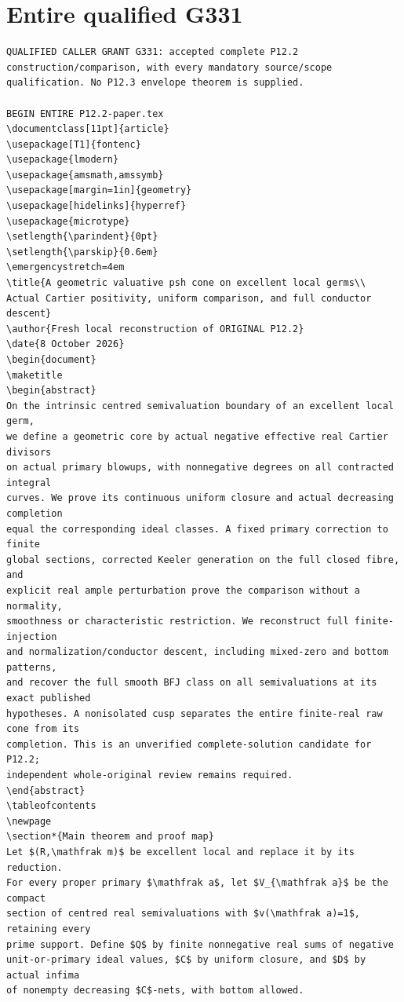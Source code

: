 \documentclass[
]{article}
\begin{document}
\section{Entire qualified G331}
\begingroup\tiny
\begin{verbatim}
QUALIFIED CALLER GRANT G331: accepted complete P12.2 construction/comparison, with every mandatory source/scope qualification. No P12.3 envelope theorem is supplied.

BEGIN ENTIRE P12.2-paper.tex
\documentclass[11pt]{article}
\usepackage[T1]{fontenc}
\usepackage{lmodern}
\usepackage{amsmath,amssymb}
\usepackage[margin=1in]{geometry}
\usepackage[hidelinks]{hyperref}
\usepackage{microtype}
\setlength{\parindent}{0pt}
\setlength{\parskip}{0.6em}
\emergencystretch=4em
\title{A geometric valuative psh cone on excellent local germs\\
Actual Cartier positivity, uniform comparison, and full conductor descent}
\author{Fresh local reconstruction of ORIGINAL P12.2}
\date{8 October 2026}
\begin{document}
\maketitle
\begin{abstract}
On the intrinsic centred semivaluation boundary of an excellent local germ,
we define a geometric core by actual negative effective real Cartier divisors
on actual primary blowups, with nonnegative degrees on all contracted integral
curves. We prove its continuous uniform closure and actual decreasing completion
equal the corresponding ideal classes. A fixed primary correction to finite
global sections, corrected Keeler generation on the full closed fibre, and
explicit real ample perturbation prove the comparison without a normality,
smoothness or characteristic restriction. We reconstruct full finite-injection
and normalization/conductor descent, including mixed-zero and bottom patterns,
and recover the full smooth BFJ class on all semivaluations at its exact published
hypotheses. A nonisolated cusp separates the entire finite-real raw cone from its
completion. This is an unverified complete-solution candidate for P12.2;
independent whole-original review remains required.
\end{abstract}
\tableofcontents
\newpage
\section*{Main theorem and proof map}
Let $(R,\mathfrak m)$ be excellent local and replace it by its reduction.
For every proper primary $\mathfrak a$, let $V_{\mathfrak a}$ be the compact
section of centred real semivaluations with $v(\mathfrak a)=1$, retaining every
prime support. Define $Q$ by finite nonnegative real sums of negative
unit-or-primary ideal values, $C$ by uniform closure, and $D$ by actual infima
of nonempty decreasing $C$-nets, with bottom allowed.


\end{verbatim}
\end{document}
